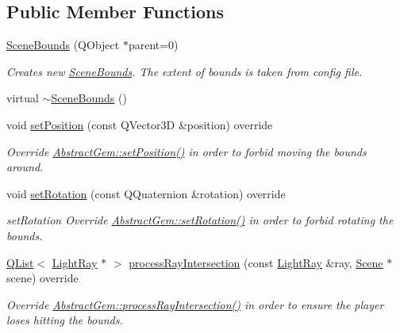 \subsection*{Public Member Functions}
\begin{DoxyCompactItemize}
\item 
\hyperlink{class_scene_bounds_a26e24012c6a45d3412745828b037dae4}{Scene\+Bounds} (Q\+Object $\ast$parent=0)
\begin{DoxyCompactList}\small\item\em Creates new \hyperlink{class_scene_bounds}{Scene\+Bounds}. The extent of bounds is taken from config file. \end{DoxyCompactList}\item 
virtual \hyperlink{class_scene_bounds_a625ef0d42c9133022a636ba5a57ad840}{$\sim$\+Scene\+Bounds} ()
\item 
void \hyperlink{class_scene_bounds_a26db5e7928d3ac7d0257dc52e1ed4e77}{set\+Position} (const Q\+Vector3\+D \&position) override
\begin{DoxyCompactList}\small\item\em Override \hyperlink{class_abstract_gem_aaf11fa4b522dc334ebed4f2d031a3e2b}{Abstract\+Gem\+::set\+Position()} in order to forbid moving the bounds around. \end{DoxyCompactList}\item 
void \hyperlink{class_scene_bounds_a2e7b2f2e66700b414584ca6b407faf72}{set\+Rotation} (const Q\+Quaternion \&rotation) override
\begin{DoxyCompactList}\small\item\em set\+Rotation Override \hyperlink{class_abstract_gem_afce4d09f74fec117d27b11a220eee6b9}{Abstract\+Gem\+::set\+Rotation()} in order to forbid rotating the bounds. \end{DoxyCompactList}\item 
\hyperlink{singleton_q_list}{Q\+List}$<$ \hyperlink{class_light_ray}{Light\+Ray} $\ast$ $>$ \hyperlink{class_scene_bounds_aeac6aafe6081e8efd6b4180e86346dc0}{process\+Ray\+Intersection} (const \hyperlink{class_light_ray}{Light\+Ray} \&ray, \hyperlink{class_scene}{Scene} $\ast$scene) override
\begin{DoxyCompactList}\small\item\em Override \hyperlink{class_abstract_gem_ab4f3c6d38acbe59a610c67588e4944d7}{Abstract\+Gem\+::process\+Ray\+Intersection()} in order to ensure the player loses hitting the bounds. \end{DoxyCompactList}\end{DoxyCompactItemize}
